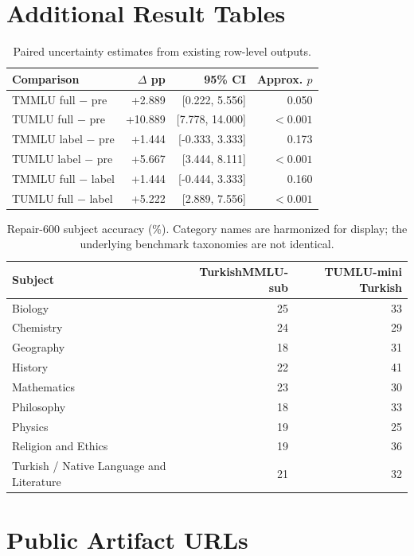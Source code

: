 \documentclass[11pt]{article}
\newcommand{\tmmlu}{TurkishMMLU-sub}
\newcommand{\tumlu}{TUMLU-mini Turkish}
\begin{document}
\appendix

\section{Additional Result Tables}

\begin{table}[H]
\centering
\small
\begin{tabular}{lrrr}
\toprule
\textbf{Comparison} & \textbf{$\Delta$ pp} & \textbf{95\% CI} & \textbf{Approx. $p$} \\
\midrule
TMMLU full $-$ pre & +2.889 & [0.222, 5.556] & 0.050 \\
TUMLU full $-$ pre & +10.889 & [7.778, 14.000] & $<0.001$ \\
TMMLU label $-$ pre & +1.444 & [-0.333, 3.333] & 0.173 \\
TUMLU label $-$ pre & +5.667 & [3.444, 8.111] & $<0.001$ \\
TMMLU full $-$ label & +1.444 & [-0.444, 3.333] & 0.160 \\
TUMLU full $-$ label & +5.222 & [2.889, 7.556] & $<0.001$ \\
\bottomrule
\end{tabular}
\caption{Paired uncertainty estimates from existing row-level outputs.}
\end{table}

\begin{table}[H]
\centering
\small
\begin{tabular}{lrr}
\toprule
\textbf{Subject} & \textbf{\tmmlu{}} & \textbf{\tumlu{}} \\
\midrule
Biology & 25 & 33 \\
Chemistry & 24 & 29 \\
Geography & 18 & 31 \\
History & 22 & 41 \\
Mathematics & 23 & 30 \\
Philosophy & 18 & 33 \\
Physics & 19 & 25 \\
Religion and Ethics & 19 & 36 \\
Turkish / Native Language and Literature & 21 & 32 \\
\bottomrule
\end{tabular}
\caption{Repair-600 subject accuracy (\%). Category names are harmonized for
display; the underlying benchmark taxonomies are not identical.}
\end{table}

\section{Public Artifact URLs}
\end{document}
